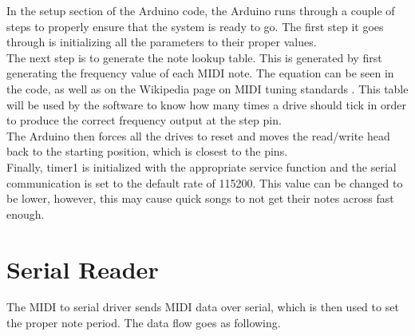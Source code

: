 \documentclass[11pt, a4paper]{report}
\begin{document}
In the setup section of the Arduino code, the Arduino runs through a couple of steps to properly ensure that the system is ready to go. The first step it goes through is initializing all the parameters to their proper values. \\



The next step is to generate the note lookup table. This is generated by first generating the frequency value of each MIDI note. The equation can be seen in the code, as well as on the Wikipedia page on MIDI tuning standards \cite{MIDIStandard}. This table will be used by the software to know how many times a drive should tick in order to produce the correct frequency output at the step pin. \\




The Arduino then forces all the drives to reset and moves the read/write head back to the starting position, which is closest to the pins. \\





Finally, timer1 is initialized with the appropriate service function and the serial communication is set to the default rate of 115200. This value can be changed to be lower, however, this may cause quick songs to not get their notes across fast enough. \\ 



\section{Serial Reader}

The MIDI to serial driver sends MIDI data over serial, which is then used to set the proper note period. The data flow goes as following. \\
\begin{center}
\end{center}
\end{document}

